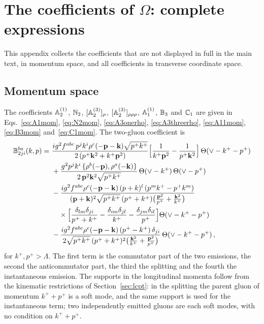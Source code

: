 \section{The coefficients of \texorpdfstring{$\Omega$}{Omega}: complete expressions}\label{app:coefficients}

This appendix collects the coefficients that are not displayed in full in the main text, in momentum space, and all coefficients in transverse coordinate space.

\subsection{Momentum space}

The coefficients $\mathbb{A}^{(1)}_2$, $\mathbb{N}_2$, $[\mathbb{A}^{(3)}_2]_\rho$, $[\mathbb{A}^{(3)}_2]_{\rho\rho\rho}$, $\mathbb{A}^{(1)}_1$, $\mathbb{B}_3$ and $\mathbb{C}_1$ are given in Eqs.~\eqref{eq:A1mom}, \eqref{eq:N2mom}, \eqref{eq:A3onerho}, \eqref{eq:A3threerho}, \eqref{eq:A11mom}, \eqref{eq:B3mom} and~\eqref{eq:C1mom}. The two-gluon coefficient is~\cite{Lublinsky:2016meo}
\begin{align}\label{eq:B2mom}
\mathbb{B}^{ba}_{2ji}(k,p)=\ &\frac{ig^2f^{abc}\,p^jk^i\rho^c(-\mathbf{p}-\mathbf{k})\sqrt{p^+k^+}}{2\,(p^+\mathbf{k}^2+k^+\mathbf{p}^2)}\Big[\frac{1}{k^+\mathbf{p}^2}-\frac{1}{p^+\mathbf{k}^2}\Big]\,\Theta(\vee-k^+-p^+)
\notag\\&
+\frac{g^2p^jk^i\,\{\rho^b(-\mathbf{p}),\rho^a(-\mathbf{k})\}}{2\,\mathbf{p}^2\mathbf{k}^2\sqrt{p^+k^+}}\,\Theta(\vee-k^+)\,\Theta(\vee-p^+)
\notag\\&
-\frac{ig^2f^{abc}\rho^c(-\mathbf{p}-\mathbf{k})\,(p+k)^l\,(p^mk^+-p^+k^m)}{(\mathbf{p}+\mathbf{k})^2\sqrt{p^+k^+}\,(p^++k^+)\big(\frac{\mathbf{p}^2}{p^+}+\frac{\mathbf{k}^2}{k^+}\big)}\notag\\&\quad\times\Big[\frac{\delta_{lm}\delta_{ji}}{p^++k^+}-\frac{\delta_{im}\delta_{jl}}{k^+}-\frac{\delta_{jm}\delta_{il}}{p^+}\Big]\Theta(\vee-k^+-p^+)
\notag\\&
-\frac{ig^2f^{abc}\rho^c(-\mathbf{p}-\mathbf{k})\,(p^+-k^+)\,\delta_{ji}}{2\sqrt{p^+k^+}\,(p^++k^+)^2\big(\frac{\mathbf{k}^2}{k^+}+\frac{\mathbf{p}^2}{p^+}\big)}\,\Theta(\vee-k^+-p^+)\,,
\end{align}
for $k^+,p^+>\Lambda$. The first term is the commutator part of the two emissions, the second the anticommutator part, the third the splitting and the fourth the instantaneous emission. The supports in the longitudinal momenta follow from the kinematic restrictions of Section~\ref{sec:lcpt}: in the splitting the parent gluon of momentum $k^++p^+$ is a soft mode, and the same support is used for the instantaneous term; two independently emitted gluons are each soft modes, with no condition on $k^++p^+$.

